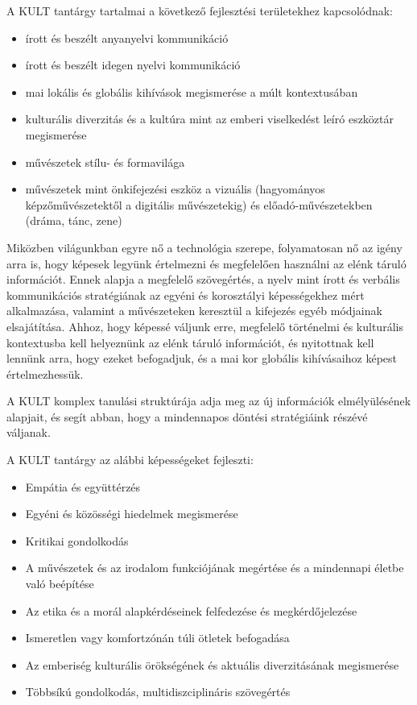 A KULT tantárgy tartalmai a következő fejlesztési területekhez kapcsolódnak:
\begin{itemize}
  \item írott és beszélt anyanyelvi kommunikáció

  \item írott és beszélt idegen nyelvi kommunikáció

  \item mai lokális és globális kihívások megismerése a múlt kontextusában

  \item kulturális diverzitás és a kultúra mint az emberi viselkedést leíró
        eszköztár megismerése

  \item művészetek stílu- és formavilága

  \item művészetek mint önkifejezési eszköz a vizuális (hagyományos
        képzőművészetektől a digitális művészetekig) és előadó-művészetekben (dráma,
        tánc, zene)
\end{itemize}

Miközben világunkban egyre nő a technológia szerepe, folyamatosan nő az igény
arra is, hogy képesek legyünk értelmezni és megfelelően használni az elénk
táruló információt. Ennek alapja a megfelelő szövegértés, a nyelv mint írott és
verbális kommunikációs stratégiának az egyéni és korosztályi képességekhez mért
alkalmazása, valamint a művészeteken keresztül a kifejezés egyéb módjainak
elsajátítása. Ahhoz, hogy képessé váljunk erre, megfelelő történelmi és
kulturális kontextusba kell helyeznünk az elénk táruló információt, és
nyitottnak kell lennünk arra, hogy ezeket befogadjuk, és a mai kor globális
kihívásaihoz képest értelmezhessük.

A KULT komplex tanulási struktúrája adja meg az új információk elmélyülésének
alapjait, és segít abban, hogy a mindennapos döntési stratégiáink részévé
váljanak.

A KULT tantárgy az alábbi képességeket fejleszti:
\begin{itemize}
  \item Empátia és együttérzés

  \item Egyéni és közösségi hiedelmek megismerése

  \item Kritikai gondolkodás

  \item A művészetek és az irodalom funkciójának megértése és a mindennapi életbe
        való beépítése

  \item Az etika és a morál alapkérdéseinek felfedezése és megkérdőjelezése

  \item Ismeretlen vagy komfortzónán túli ötletek befogadása

  \item Az emberiség kulturális örökségének és aktuális diverzitásának
        megismerése

  \item Többsíkú gondolkodás, multidiszciplináris szövegértés
\end{itemize}

